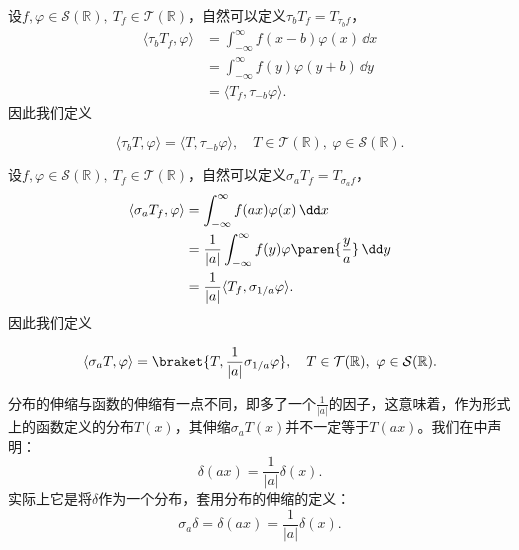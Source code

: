 设$f,\varphi\in\mathcal{S}(\mathbb{R}),\ T_f\in\mathcal{T}(\mathbb{R})$，自然可以定义$\tau_b T_f=T_{\tau_b f}$，
\begin{align}
    \langle \tau_b T_f,\varphi\rangle & =\int_{-\infty}^{\infty}f(x-b)\varphi(x)\,\dd x\nonumber \\
                                      & =\int_{-\infty}^{\infty}f(y)\varphi(y+b)\,\dd y\nonumber \\
                                      & =\langle T_f,\tau_{-b}\varphi\rangle.
\end{align}
因此我们定义
\begin{definition}[分布的平移]\label{def:distribution_delay}
    \begin{equation}
        \langle \tau_b T,\varphi\rangle=\langle T,\tau_{-b}\varphi\rangle,\quad T\in\mathcal{T}(\mathbb{R}),\ \varphi\in\mathcal{S}(\mathbb{R}).
    \end{equation}
\end{definition}

设$f,\varphi\in\mathcal{S}(\mathbb{R}),\ T_f\in\mathcal{T}(\mathbb{R})$，自然可以定义$\sigma_a T_f=T_{\sigma_a f}$，
\begin{align}
    \langle \sigma_a T_f,\varphi\rangle & =\int_{-\infty}^{\infty}f(ax)\varphi(x)\,\dd x\nonumber                                  \\
                                        & =\frac{1}{|a|}\int_{-\infty}^{\infty}f(y)\varphi\paren{\frac{y}{a}}\,\dd y\nonumber \\
                                        & =\frac{1}{|a|}\langle T_f,\sigma_{1/a}\varphi\rangle.
\end{align}
因此我们定义
\begin{definition}[分布的伸缩]
    \begin{equation}
        \langle\sigma_a T,\varphi\rangle=\braket{T,\frac{1}{|a|}\sigma_{1/a}\varphi},\quad T\in\mathcal{T}(\mathbb{R}),\ \varphi\in\mathcal{S}(\mathbb{R}).
    \end{equation}
\end{definition}

分布的伸缩与函数的伸缩有一点不同，即多了一个$\displaystyle \frac{1}{|a|}$的因子，这意味着，作为形式上的函数定义的分布$T(x)$，其伸缩$\sigma_a T(x)$并不一定等于$T(ax)$。我们在中声明：
\begin{equation}
    \delta(ax)=\frac{1}{|a|}\delta(x).
\end{equation}
实际上它是将$\delta$作为一个分布，套用分布的伸缩的定义：
\begin{equation}
    \sigma_a\delta=\delta(ax)=\frac{1}{|a|}\delta(x).
\end{equation}

